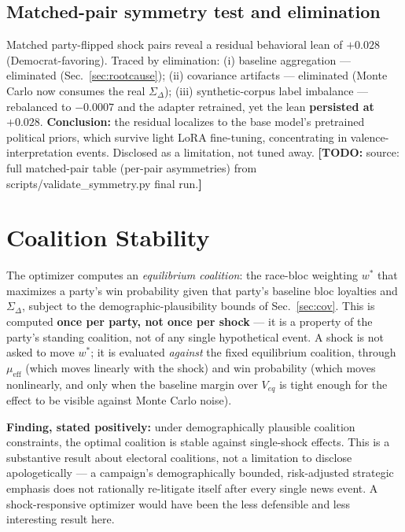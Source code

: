 \documentclass[11pt]{article}
\newcommand{\todo}[1]{{\color{red}\textbf{[TODO:} #1\textbf{]}}}
\begin{document}
\subsection{Matched-pair symmetry test and elimination}
Matched party-flipped shock pairs reveal a residual behavioral lean of
\textbf{$+0.028$} (Democrat-favoring). Traced by elimination:
(i) baseline aggregation --- eliminated (Sec.~\ref{sec:rootcause});
(ii) covariance artifacts --- eliminated (Monte Carlo now consumes the real
$\Sigma_\Delta$);
(iii) synthetic-corpus label imbalance --- rebalanced to $-0.0007$ and the
adapter retrained, yet the lean \textbf{persisted at $+0.028$}.
\textbf{Conclusion:} the residual localizes to the base model's pretrained
political priors, which survive light LoRA fine-tuning, concentrating in
valence-interpretation events. Disclosed as a limitation, not tuned away.
\todo{source: full matched-pair table (per-pair asymmetries) from
scripts/validate\_symmetry.py final run.}

\section{Coalition Stability}\label{sec:stability}
The optimizer computes an \emph{equilibrium coalition}: the race-bloc
weighting $w^{*}$ that maximizes a party's win probability given that
party's baseline bloc loyalties and $\Sigma_\Delta$, subject to the
demographic-plausibility bounds of Sec.~\ref{sec:cov}. This is computed
\textbf{once per party, not once per shock} --- it is a property of the
party's standing coalition, not of any single hypothetical event. A shock is
not asked to move $w^{*}$; it is evaluated \emph{against} the fixed
equilibrium coalition, through $\mu_{\text{eff}}$ (which moves linearly with
the shock) and win probability (which moves nonlinearly, and only when the
baseline margin over $V_{eq}$ is tight enough for the effect to be visible
against Monte Carlo noise).

\textbf{Finding, stated positively:} under demographically plausible
coalition constraints, the optimal coalition is stable against single-shock
effects. This is a substantive result about electoral coalitions, not a
limitation to disclose apologetically --- a campaign's demographically
bounded, risk-adjusted strategic emphasis does not rationally re-litigate
itself after every single news event. A shock-responsive optimizer would
have been the less defensible and less interesting result here.
\end{document}
